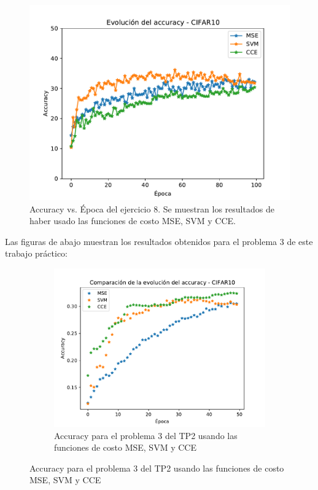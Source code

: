 \begin{figure}[H]
    \centering
    \includegraphics[width=0.45 \textwidth]{image/EJ8_Comparacion.pdf}
    \caption{Accuracy vs. Época del ejercicio 8. Se muestran los resultados de haber usado las funciones de costo MSE, SVM y CCE.}
    \label{fig:my_label}
\end{figure}

Las figuras de abajo muestran los resultados obtenidos para el problema 3 de este trabajo práctico:
\begin{figure}[H]
     \centering
     \begin{subfigure}[b]{0.45\textwidth}
         \centering
         \includegraphics[width=\textwidth]{image/EJ3comparacion2.pdf}
         \caption{Accuracy para el problema 3 del TP2 usando las funciones de costo MSE, SVM y CCE}
         \label{fig:acc6a}
     \end{subfigure}
    \label{fig:ej3_TP2}
\end{figure}

